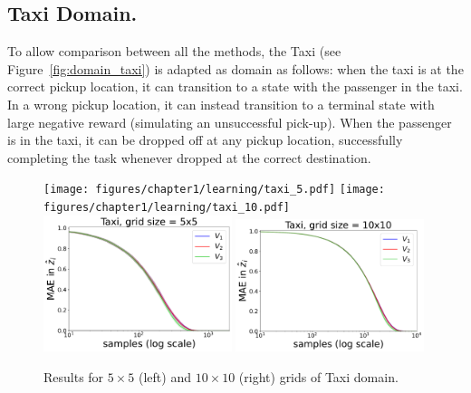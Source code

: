 

\subsection{Taxi Domain.}
To allow comparison between all the methods, the Taxi (see Figure~\ref{fig:domain_taxi}) is adapted as domain as follows: when the taxi is at the correct pickup location, it can transition to a state with the passenger in the taxi.
In a wrong pickup location, it can instead transition to a terminal state with large negative reward (simulating an unsuccessful pick-up).
When the passenger is in the taxi, it can be dropped off at any pickup location, successfully completing the task whenever dropped at the correct destination.

\begin{figure}[!h]
\centering
\texttt{[image: figures/chapter1/learning/taxi\_5.pdf]}
\texttt{[image: figures/chapter1/learning/taxi\_10.pdf]}
\includegraphics[width=0.49\textwidth]{figures/chapter1/subtasks/taxi_5_subtasks.pdf}
\includegraphics[width=0.49\textwidth]{figures/chapter1/subtasks/taxi_10_subtasks.pdf}
\caption{Results for $5 \times 5$ (left) and $10 \times 10$ (right) grids of Taxi domain.}
\label{fig:hlmdps_errors_taxi}
\end{figure}


